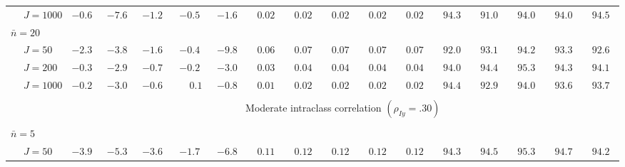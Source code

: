 \begin{sidewaystable}
\begin{threeparttable}
\begin{tabular}{llccccccccccccccc}
 & \nopagebreak $\;J=1000$  & ${-}0.6\phantom{0}$ & ${-}7.6\phantom{0}$ & ${-}1.2\phantom{0}$ & ${-}0.5\phantom{0}$ & ${-}1.6\phantom{0}$ & $\phantom{0}0.02\phantom{0}$ & $\phantom{0}0.02\phantom{0}$ & $\phantom{0}0.02\phantom{0}$ & $\phantom{0}0.02\phantom{0}$ & $\phantom{0}0.02\phantom{0}$ & $\phantom{0}94.3\phantom{0}$ & $\phantom{0}91.0\phantom{0}$ & $\phantom{0}94.0\phantom{0}$ & $\phantom{0}94.0\phantom{0}$ & $\phantom{0}94.5\phantom{0}$ \\
\multicolumn{4}{l}{$\bar{n}=20$} \\  & \nopagebreak $\;J=50$  & ${-}2.3\phantom{0}$ & ${-}3.8\phantom{0}$ & ${-}1.6\phantom{0}$ & ${-}0.4\phantom{0}$ & ${-}9.8\phantom{0}$ & $\phantom{0}0.06\phantom{0}$ & $\phantom{0}0.07\phantom{0}$ & $\phantom{0}0.07\phantom{0}$ & $\phantom{0}0.07\phantom{0}$ & $\phantom{0}0.07\phantom{0}$ & $\phantom{0}92.0\phantom{0}$ & $\phantom{0}93.1\phantom{0}$ & $\phantom{0}94.2\phantom{0}$ & $\phantom{0}93.3\phantom{0}$ & $\phantom{0}92.6\phantom{0}$ \\
 & \nopagebreak $\;J=200$  & ${-}0.3\phantom{0}$ & ${-}2.9\phantom{0}$ & ${-}0.7\phantom{0}$ & ${-}0.2\phantom{0}$ & ${-}3.0\phantom{0}$ & $\phantom{0}0.03\phantom{0}$ & $\phantom{0}0.04\phantom{0}$ & $\phantom{0}0.04\phantom{0}$ & $\phantom{0}0.04\phantom{0}$ & $\phantom{0}0.04\phantom{0}$ & $\phantom{0}94.0\phantom{0}$ & $\phantom{0}94.4\phantom{0}$ & $\phantom{0}95.3\phantom{0}$ & $\phantom{0}94.3\phantom{0}$ & $\phantom{0}94.1\phantom{0}$ \\
 & \nopagebreak $\;J=1000$  & ${-}0.2\phantom{0}$ & ${-}3.0\phantom{0}$ & ${-}0.6\phantom{0}$ & $\phantom{-}0.1\phantom{0}$ & ${-}0.8\phantom{0}$ & $\phantom{0}0.01\phantom{0}$ & $\phantom{0}0.02\phantom{0}$ & $\phantom{0}0.02\phantom{0}$ & $\phantom{0}0.02\phantom{0}$ & $\phantom{0}0.02\phantom{0}$ & $\phantom{0}94.4\phantom{0}$ & $\phantom{0}92.9\phantom{0}$ & $\phantom{0}94.0\phantom{0}$ & $\phantom{0}93.6\phantom{0}$ & $\phantom{0}93.7\phantom{0}$ \\
[0.5ex]\hline\\[-1.6ex] 
& & \multicolumn{15}{c}{Moderate intraclass correlation $(\rho_{Iy}=.30)$} \\[0.6ex]\hline\\[-1.8ex]
\multicolumn{4}{l}{$\bar{n}=5$} \\  & \nopagebreak $\;J=50$  & ${-}3.9\phantom{0}$ & ${-}5.3\phantom{0}$ & ${-}3.6\phantom{0}$ & ${-}1.7\phantom{0}$ & ${-}6.8\phantom{0}$ & $\phantom{0}0.11\phantom{0}$ & $\phantom{0}0.12\phantom{0}$ & $\phantom{0}0.12\phantom{0}$ & $\phantom{0}0.12\phantom{0}$ & $\phantom{0}0.12\phantom{0}$ & $\phantom{0}94.3\phantom{0}$ & $\phantom{0}94.5\phantom{0}$ & $\phantom{0}95.3\phantom{0}$ & $\phantom{0}94.7\phantom{0}$ & $\phantom{0}94.2\phantom{0}$ \\

\end{tabular}
\end{threeparttable}
\end{sidewaystable}
